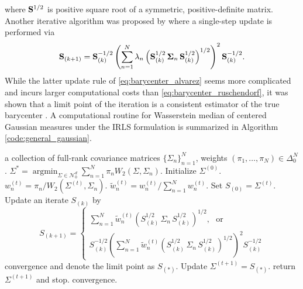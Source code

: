 \documentclass[11pt]{article}
\DeclareMathOperator*{\argmin}{argmin}
\newcommand{\calN}{\mathcal{N}}
\begin{document}
where ${\bf S}^{1/2}$ is positive square root of a symmetric, positive-definite matrix. Another iterative algorithm was proposed by \cite{alvarez-esteban_2016_FixedpointApproachBarycenters} where a single-step update is performed via 
\begin{equation}\label{eq:barycenter_alvarez}
	{\bf S}_{(k+1)} = {\bf S}_{(k)}^{-1/2}  \left(\sum_{n=1}^N \lambda_n  \left({\bf S}_{(k)}^{1/2}\, {\bf \Sigma}_n \,{\bf S}_{(k)}^{1/2}\right)^{1/2}\right)^2 {\bf S}_{(k)}^{-1/2}.
\end{equation}
While the latter update rule of \eqref{eq:barycenter_alvarez} seems  more complicated and incurs larger computational costs than \eqref{eq:barycenter_ruschendorf}, it was shown that a limit point of the iteration is a consistent estimator of the true barycenter \citep[Theorem 4.2]{alvarez-esteban_2016_FixedpointApproachBarycenters}. A computational routine for Wasserstein median of centered Gaussian measures under the IRLS formulation is summarized in Algorithm \ref{code:general_gaussian}.




\begin{algorithm}[h]
	\caption{Wasserstein median of centered Gaussian measures.}
	\label{code:general_gaussian}
	\begin{algorithmic}
		\REQUIRE a collection of full-rank covariance matrices $\lbrace \Sigma_n \rbrace_{n=1}^N$, weights $(\pi_1,\ldots,\pi_N)\in\Delta_0^N$.
		\ENSURE $\Sigma^* = \argmin_{\Sigma \in \calN_0^d} \sum_{n=1}^N \pi_n W_2 (\Sigma, \Sigma_n)$.
		\STATE Initialize $\Sigma^{(0)}$.
		\REPEAT 
		\STATE $w_n^{(t)} = \pi_n / W_2 (\Sigma^{(t)}, \Sigma_n)$.
		\STATE $\tilde{w}_n^{(t)} = w_n^{(t)}/\sum_{n=1}^N w_n^{(t)}$.
		\STATE Set $S_{(0)} = \Sigma^{(t)}$.
		\REPEAT
		\STATE Update an iterate $S_{(k)}$ by 
		\begin{equation*}
			S_{(k+1)}= \begin{cases}
				\sum_{n=1}^N \tilde{w}_n^{(t)}  \left(S_{(k)}^{1/2} \, \Sigma_n \, S_{(k)}^{1/2}\right)^{1/2},\,\, \textrm{ or } \\[10pt]
				S_{(k)}^{-1/2}  \left(\sum_{n=1}^N \tilde{w}_n^{(t)}  \left(S_{(k)}^{1/2}\, \Sigma_n \,S_{(k)}^{1/2}\right)^{1/2}\right)^2 S_{(k)}^{-1/2}
			\end{cases}
		\end{equation*}
		\UNTIL convergence and denote the limit point as $S_{(*)}$.
		\STATE Update $\Sigma^{(t+1)} = S_{(*)}$.
		\STATE return $\Sigma^{(t+1)}$ and stop. 
		\ENDIF 
		\UNTIL convergence.
	\end{algorithmic}
\end{algorithm}
\end{document}
